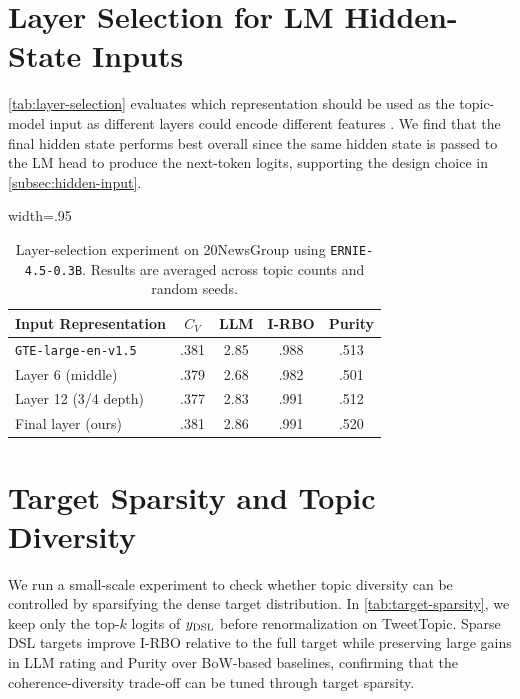 \documentclass{article}
\theoremstyle{plain}
\theoremstyle{definition}
\theoremstyle{remark}
\begin{document}
\section{Layer Selection for LM Hidden-State Inputs}
\label{app:layer-selection}

\autoref{tab:layer-selection} evaluates which representation should be used as the topic-model input as different layers could encode different features \citep{niu-etal-2022-bert, jin-etal-2025-exploring}. We find that the final hidden state performs best overall since the same hidden state is passed to the LM head to produce the next-token logits, supporting the design choice in \autoref{subsec:hidden-input}.

\begin{table}[h]
\centering
\begin{adjustbox}{width=.95\linewidth}
\begin{tabular}{lcccc}
\toprule
Input Representation & $C_V$ & LLM & I-RBO & Purity \\
\midrule
\texttt{GTE-large-en-v1.5} & .381 & 2.85 & .988 & .513 \\
Layer 6 (middle) & .379 & 2.68 & .982 & .501 \\
Layer 12 (3/4 depth) & .377 & 2.83 & .991 & .512 \\
Final layer (ours) & .381 & 2.86 & .991 & .520 \\
\bottomrule
\end{tabular}
\end{adjustbox}
\caption{Layer-selection experiment on 20NewsGroup using \texttt{ERNIE-4.5-0.3B}. Results are averaged across topic counts and random seeds.}
\label{tab:layer-selection}
\end{table}

\section{Target Sparsity and Topic Diversity}
\label{app:target-sparsity}

We run a small-scale experiment to check whether topic diversity can be controlled by sparsifying the dense target distribution. In \autoref{tab:target-sparsity}, we keep only the top-$k$ logits of $y_{\rm DSL}$ before renormalization on TweetTopic. Sparse DSL targets improve I-RBO relative to the full target while preserving large gains in LLM rating and Purity over BoW-based baselines, confirming that the coherence-diversity trade-off can be tuned through target sparsity.
\end{document}
